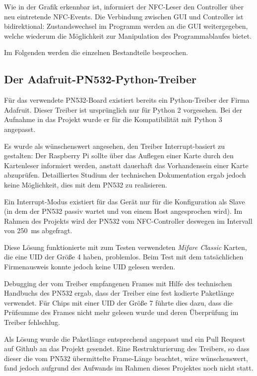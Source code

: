 \documentclass[11pt,a4paper]{IEEEtran}
\begin{document}
Wie in der Grafik erkennbar ist, informiert der NFC-Leser den Controller über
neu eintretende NFC-Events. Die Verbindung zwischen GUI und Controller ist
bidirektional: Zustandswechsel im Programm werden an die GUI weitergegeben, 
welche wiederum die Möglichkeit zur Manipulation des Programmablaufes bietet.

Im Folgenden werden die einzelnen Bestandteile besprochen.

\subsection{Der Adafruit-PN532-Python-Treiber} 

Für das verwendete PN532-Board existiert bereits ein Python-Treiber der Firma
Adafruit\autocite{AdafruitPN532}. Dieser Treiber ist ursprünglich nur für Python
2 vorgesehen. Bei der Aufnahme in das Projekt wurde er für die Kompatibilität
mit Python 3 angepasst.

Es wurde als wünschenswert angesehen, den Treiber Interrupt-basiert zu
gestalten: Der Raspberry Pi sollte über das Auflegen einer Karte durch den
Kartenleser informiert werden, anstatt dauerhaft das Vorhandensein einer Karte
abzuprüfen. Detailliertes Studium der technischen
Dokumentation\autocite{Pn532Manual} ergab jedoch keine Möglichkeit, dies mit
dem PN532 zu realisieren. 

Ein Interrupt-Modus existiert für das Gerät nur für 
die Konfiguration als Slave (in dem der PN532 passiv wartet und von einem Host
angesprochen wird). Im Rahmen des Projekts wird der PN532 vom NFC-Controller
deswegen im Intervall von \SI{250}{\milli\second} abgefragt.

Diese Lösung funktionierte mit zum Testen verwendeten \emph{Mifare Classic}
Karten, die eine UID der Größe \SI{4}{\byte} haben, problemlos. Beim Test mit
dem tatsächlichen Firmenausweis konnte jedoch keine UID gelesen werden.

Debugging der vom Treiber empfangenen Frames mit Hilfe des technischen Handbuchs
des PN532 ergab, dass der Treiber eine fest kodierte Paketlänge verwendet. Für
Chips mit einer UID der Größe \SI{7}{\byte} führte dies dazu, dass die 
Prüfsumme des Frames nicht mehr gelesen wurde und deren Überprüfung im Treiber
fehlschlug.

Als Lösung wurde die Paketlänge entsprechend angepasst und ein Pull Request auf
Github an das Projekt gesendet\autocite{AdafruitPullRequest}. Eine
Restrukturierung des Treibers, so dass dieser die vom PN532 übermittelte 
Frame-Länge beachtet, wäre wünschenswert, fand jedoch aufgrund des Aufwands
im Rahmen dieses Projektes noch nicht statt.
\end{document}
